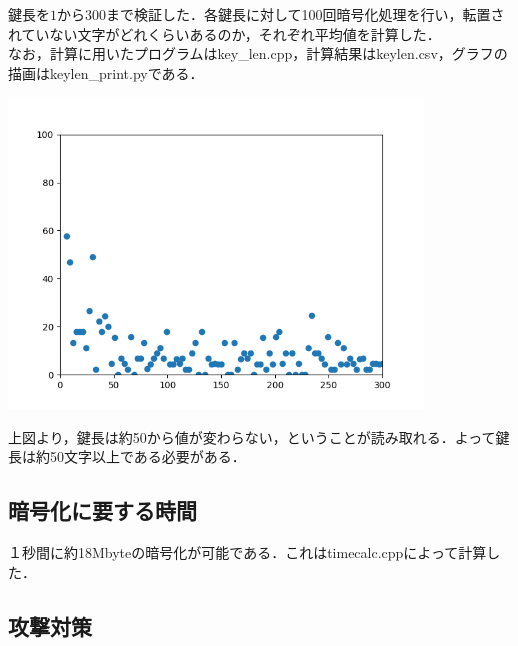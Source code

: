 \documentclass{jsarticle}
\begin{document}
鍵長を$1$から$300$まで検証した．各鍵長に対して100回暗号化処理を行い，転置されていない文字がどれくらいあるのか，それぞれ平均値を計算した．\\
なお，計算に用いたプログラムはkey\_len.cpp，計算結果はkeylen.csv，グラフの描画はkeylen\_print.pyである．\\
\begin{center}
  \includegraphics[width=11cm]{./tex_pic/figure.png}\\
\end{center}
上図より，鍵長は約50から値が変わらない，ということが読み取れる．よって鍵長は約50文字以上である必要がある．

\subsection{暗号化に要する時間}
１秒間に約18Mbyteの暗号化が可能である．これはtimecalc.cppによって計算した．

\subsection{攻撃対策}
\end{document}

